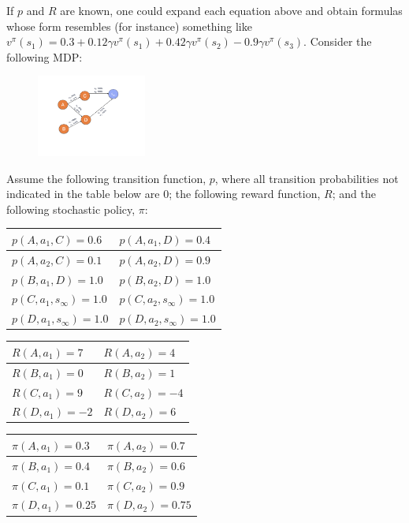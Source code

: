 \documentclass{article}
\begin{document}
\begin{enumerate}
If $p$ and $R$ are known, one could expand each equation above and obtain formulas whose form resembles (for instance) something like $v^\pi(s_1) = 0.3 + 0.12 \gamma v^\pi(s_1) + 0.42 \gamma v^\pi(s_2) - 0.9 \gamma v^\pi(s_3)$. Consider the following MDP:

\begin{figure}[h!!!]
    \centering
    \includegraphics[width=0.32\textwidth]{HW_figs/HW3_MDP.pdf}
\end{figure}

Assume the following transition function, $p$, where all transition probabilities not indicated in the table below are $0$; the following reward function, $R$; and the following stochastic policy, $\pi$:

\begin{table}[h!!!!]
\centering
\footnotesize
\begin{tabular}[t]{|l|l|}
\hline
$p(A,a_1,C)=0.6$    &   $p(A,a_1,D)=0.4$ \\ \hline
$p(A,a_2,C)=0.1$    &   $p(A,a_2,D)=0.9$ \\ \hline
$p(B,a_1,D)=1.0$    &   $p(B,a_2,D)=1.0$ \\ \hline
$p(C,a_1,s_\infty)=1.0$    &   $p(C,a_2,s_\infty)=1.0$ \\ \hline
$p(D,a_1,s_\infty)=1.0$    &   $p(D,a_2,s_\infty)=1.0$ \\ \hline
\end{tabular}
%
\begin{tabular}[t]{|l|l|}
\hline     
$R(A,a_1)=7$ & $R(A,a_2)=4$ \\ \hline
$R(B,a_1)=0$ & $R(B,a_2)=1$ \\ \hline
$R(C,a_1)=9$ & $R(C,a_2)=-4$ \\ \hline
$R(D,a_1)=-2$ & $R(D,a_2)=6$ \\ \hline
\end{tabular}
%
\begin{tabular}[t]{|l|l|}
\hline
$\pi(A,a_1)=0.3$ & $\pi(A,a_2)=0.7$  \\ \hline
$\pi(B,a_1)=0.4$ & $\pi(B,a_2)=0.6$ \\ \hline
$\pi(C,a_1)=0.1$ & $\pi(C,a_2)=0.9$ \\ \hline
$\pi(D,a_1)=0.25$ & $\pi(D,a_2)=0.75$  \\ \hline
\end{tabular}
\end{table}
    

\end{enumerate}
\end{document}

